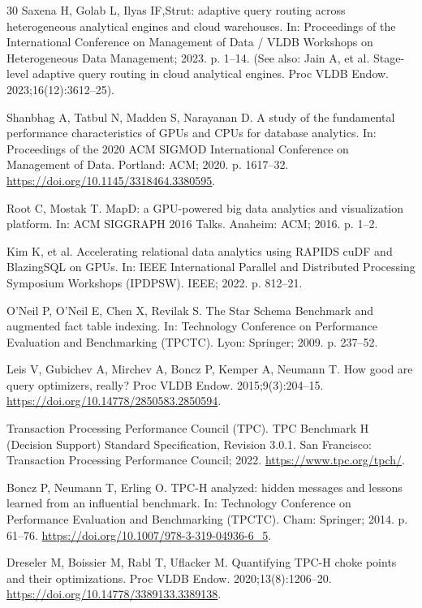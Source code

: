 \documentclass[10pt,a4paper]{article}
\begin{document}
\begin{thebibliography}{30}
Saxena H, Golab L, Ilyas IF,Strut: adaptive query routing across heterogeneous analytical engines and cloud warehouses. In: Proceedings of the International Conference on Management of Data / VLDB Workshops on Heterogeneous Data Management; 2023. p. 1--14. (See also: Jain A, et al. Stage-level adaptive query routing in cloud analytical engines. Proc VLDB Endow. 2023;16(12):3612--25).

Shanbhag A, Tatbul N, Madden S, Narayanan D. A study of the fundamental performance characteristics of GPUs and CPUs for database analytics. In: Proceedings of the 2020 ACM SIGMOD International Conference on Management of Data. Portland: ACM; 2020. p. 1617--32. \url{https://doi.org/10.1145/3318464.3380595}.

Root C, Mostak T. MapD: a GPU-powered big data analytics and visualization platform. In: ACM SIGGRAPH 2016 Talks. Anaheim: ACM; 2016. p. 1--2.

Kim K, et al. Accelerating relational data analytics using RAPIDS cuDF and BlazingSQL on GPUs. In: IEEE International Parallel and Distributed Processing Symposium Workshops (IPDPSW). IEEE; 2022. p. 812--21.

O'Neil P, O'Neil E, Chen X, Revilak S. The Star Schema Benchmark and augmented fact table indexing. In: Technology Conference on Performance Evaluation and Benchmarking (TPCTC). Lyon: Springer; 2009. p. 237--52.

Leis V, Gubichev A, Mirchev A, Boncz P, Kemper A, Neumann T. How good are query optimizers, really? Proc VLDB Endow. 2015;9(3):204--15. \url{https://doi.org/10.14778/2850583.2850594}.

Transaction Processing Performance Council (TPC). TPC Benchmark H (Decision Support) Standard Specification, Revision 3.0.1. San Francisco: Transaction Processing Performance Council; 2022. \url{https://www.tpc.org/tpch/}.

Boncz P, Neumann T, Erling O. TPC-H analyzed: hidden messages and lessons learned from an influential benchmark. In: Technology Conference on Performance Evaluation and Benchmarking (TPCTC). Cham: Springer; 2014. p. 61--76. \url{https://doi.org/10.1007/978-3-319-04936-6_5}.

Dreseler M, Boissier M, Rabl T, Uflacker M. Quantifying TPC-H choke points and their optimizations. Proc VLDB Endow. 2020;13(8):1206--20. \url{https://doi.org/10.14778/3389133.3389138}.


\end{thebibliography}
\end{document}
